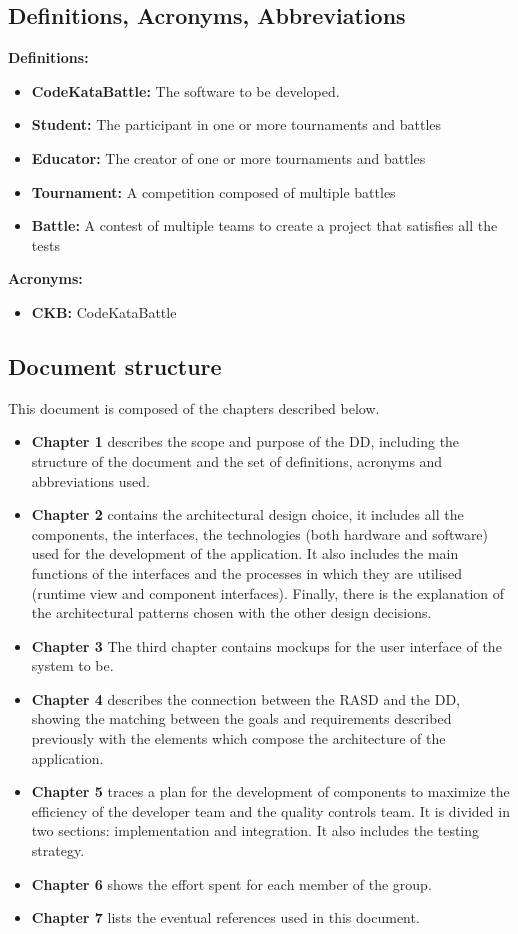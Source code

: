 \documentclass[a4paper, 11pt, titlepage]{article}
\begin{document}
\subsection{Definitions, Acronyms, Abbreviations}
\textbf{Definitions:}
\begin{itemize}
    \item \textbf{CodeKataBattle:} The software to be developed.
    \item \textbf{Student:} The participant in one or more tournaments and battles
    \item \textbf{Educator:} The creator of one or more tournaments and battles
    \item \textbf{Tournament:} A competition composed of multiple battles
    \item \textbf{Battle:} A contest of multiple teams to create a project that satisfies all the tests
\end{itemize}
\textbf{Acronyms:}
\begin{itemize}
    \item \textbf{CKB:} CodeKataBattle
\end{itemize}

\newpage

\subsection{Document structure}
This document is composed of the chapters described below.
\begin{itemize}
  \item \textbf{Chapter 1} describes the scope and purpose of the DD, including the structure of the document and the set of definitions, acronyms and abbreviations used.
  \item \textbf{Chapter 2} contains the architectural design choice, it includes all the components, the interfaces, the technologies (both hardware and software) used for the development of the application. It also includes the main functions of the interfaces and the processes in which they are utilised (runtime view and component interfaces). Finally, there is the explanation of the architectural patterns chosen with the other design decisions.
  \item \textbf{Chapter 3} The third chapter contains mockups for the user interface of the system to be.
  \item \textbf{Chapter 4} describes the connection between the RASD and the DD, showing the matching between the goals and requirements described previously with the elements which compose the architecture of the application.
  \item \textbf{Chapter 5} traces a plan for the development of components to maximize the efficiency of the developer team and the quality controls team. It is divided in two sections: implementation and integration. It also includes the testing strategy.
  \item \textbf{Chapter 6} shows the effort spent for each member of the group.
  \item \textbf{Chapter 7} lists the eventual references used in this document.
\end{itemize}
\end{document}
